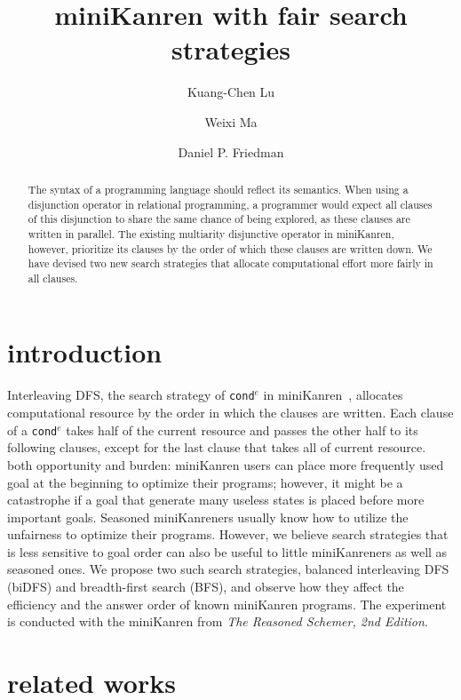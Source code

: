 \documentclass[format=acmlarge, review=true, authordraft=true]{acmart}
\title{miniKanren with fair search strategies}
\author{Kuang-Chen Lu}
\affiliation{Indiana University}
\author{Weixi Ma}
\affiliation{Indiana University}
\author{Daniel P. Friedman}
\affiliation{Indiana University}
\newcommand{\conde}{\texttt{cond$^e$} }
\begin{document}

\begin{abstract}

The syntax of a programming language should reflect its semantics. When using a
disjunction operator in relational programming, a programmer would expect all
clauses of this disjunction to share the same chance of being explored, as
these clauses are written in parallel. The existing multiarity disjunctive
operator in miniKanren, however, prioritize its clauses by the order of which
these clauses are written down. We have devised two new search strategies that
allocate computational effort more fairly in all clauses.

\end{abstract}

\maketitle

\section{introduction}

Interleaving DFS, the search strategy of \conde in
miniKanren~\citep{friedman_reasoned_2018}, allocates computational resource
by the order in which the clauses are written. Each clause of a
\conde takes half of the current resource and passes the other half
to its following clauses, except for the last clause that takes all of current
resource. 
both opportunity and burden: miniKanren users can place more frequently used 
goal at the beginning to optimize their programs; however, it might be a 
catastrophe if a goal that generate many useless states is placed before more 
important goals. Seasoned miniKanreners usually know how to utilize 
the unfairness to optimize their programs. However, we believe search strategies 
that is less sensitive to goal order can also be useful to little miniKanreners 
as well as seasoned ones. We propose two such search strategies, balanced 
interleaving DFS (biDFS) and breadth-first search (BFS), and observe how they 
affect the efficiency and the answer order of known miniKanren programs. The 
experiment is conducted with the miniKanren from \textit{The Reasoned Schemer, 
2nd Edition}.

\section{related works}
\end{document}

